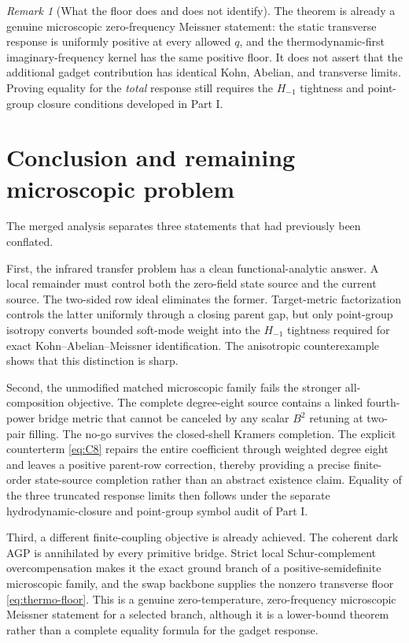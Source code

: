 \documentclass[11pt]{article}
\theoremstyle{definition}
\theoremstyle{remark}
\newtheorem{remark}[theorem]{Remark}
\begin{document}
\begin{remark}[What the floor does and does not identify]
The theorem is already a genuine microscopic zero-frequency Meissner statement: the static transverse response is uniformly positive at every allowed $q$, and the thermodynamic-first imaginary-frequency kernel has the same positive floor.  It does not assert that the additional gadget contribution has identical Kohn, Abelian, and transverse limits.  Proving equality for the \emph{total} response still requires the $H_{-1}$ tightness and point-group closure conditions developed in Part I.
\end{remark}


\section{Conclusion and remaining microscopic problem}
\label{sec:conclusion}

The merged analysis separates three statements that had previously been
conflated.

First, the infrared transfer problem has a clean functional-analytic answer.
A local remainder must control both the zero-field state source and the current
source.  The two-sided row ideal eliminates the former.  Target-metric
factorization controls the latter uniformly through a closing parent gap, but
only point-group isotropy converts bounded soft-mode weight into the
$H_{-1}$ tightness required for exact Kohn--Abelian--Meissner identification.
The anisotropic counterexample shows that this distinction is sharp.

Second, the unmodified matched microscopic family fails the stronger
all-composition objective.  The complete degree-eight source contains a linked
fourth-power bridge metric that cannot be canceled by any scalar $B^2$ retuning
at two-pair filling.  The no-go survives the closed-shell Kramers completion.
The explicit counterterm \eqref{eq:C8} repairs the entire coefficient through
weighted degree eight and leaves a positive parent-row correction, thereby
providing a precise finite-order state-source completion rather than an
abstract existence claim.  Equality of the three truncated response limits then
follows under the separate hydrodynamic-closure and point-group symbol audit of
Part I.

Third, a different finite-coupling objective is already achieved.  The coherent
dark AGP is annihilated by every primitive bridge.  Strict local
Schur-complement overcompensation makes it the exact ground branch of a
positive-semidefinite microscopic family, and the swap backbone supplies the
nonzero transverse floor \eqref{eq:thermo-floor}.  This is a genuine
zero-temperature, zero-frequency microscopic Meissner statement for a selected
branch, although it is a lower-bound theorem rather than a complete equality
formula for the gadget response.
\end{document}
